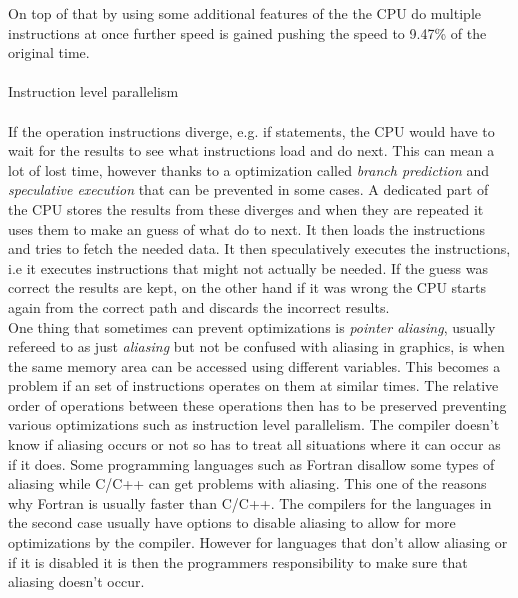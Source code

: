 \documentclass[10pt,a4paper]{report}
\begin{document}
On top of that by using some additional features of the the CPU do multiple instructions at once further speed is gained pushing the speed to 9.47\% of the original time\cite{drepper2007cpumemory}. \\
\\
Instruction level parallelism\\ %
\\
If the operation instructions diverge, e.g. if statements, the CPU would have to wait for the results to see what instructions load and do next\cite{drepper2007cpumemory}. This can mean a lot of lost time, however thanks to a optimization called \emph{branch prediction} and \emph{speculative execution} that can be prevented in some cases\cite{drepper2007cpumemory}. A dedicated part of the CPU stores the results from these diverges and when they are repeated it uses them to make an guess of what do to next\cite{drepper2007cpumemory}. It then loads the instructions and tries to fetch the needed data\cite{drepper2007cpumemory}. It then speculatively executes the instructions, i.e it executes instructions that might not actually be needed\cite{drepper2007cpumemory}. If the guess was correct the results are kept, on the other hand if it was wrong the CPU starts again from the correct path and discards the incorrect results\cite{drepper2007cpumemory}.
\\
One thing that sometimes can prevent optimizations is \emph{pointer aliasing}, usually refereed to as just \emph{aliasing} but not be confused with aliasing in graphics, is when the same memory area can be accessed using different variables\cite{introduction_hpc_hager}. This becomes a problem if an set of instructions operates on them at similar times. The relative order of operations between these operations then has to be preserved preventing various optimizations such as instruction level parallelism. The compiler doesn't know if aliasing occurs or not so has to treat all situations where it can occur as if it does\cite{introduction_hpc_hager}. Some programming languages such as Fortran disallow some types of aliasing while C/C++ can get problems with aliasing\cite{introduction_hpc_hager}. This one of the reasons why Fortran is usually faster than C/C++\cite{introduction_hpc_hager}. The compilers for the languages in the second case usually have options to disable aliasing to allow for more optimizations by the compiler. However for languages that don't allow aliasing or if it is disabled it is then the programmers responsibility to make sure that aliasing doesn't occur\cite{introduction_hpc_hager}.
\end{document}
